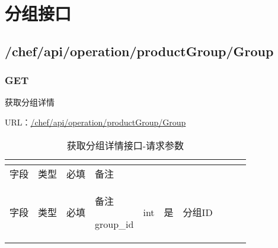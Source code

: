\begin{lstlisting}[language=bash]

\end{lstlisting}






\begin{lstlisting}[language=bash]

\end{lstlisting}



\begin{lstlisting}[language=bash]

\end{lstlisting}






\begin{lstlisting}[language=bash]

\end{lstlisting}



\begin{lstlisting}[language=bash]

\end{lstlisting}







\chapter{分组接口}


\section{/chef/api/operation/productGroup/Group}


\subsection{GET}

获取分组详情

URL：\url{/chef/api/operation/productGroup/Group}





\begin{longtable}{|m{50pt}|m{40pt}|m{50pt}|m{50pt}|}
\tabularnewline\hline
字段&类型&必填&备注
\endhead

\caption{获取分组详情接口-请求参数}\\
\hline
字段&类型&必填&备注
\endfirsthead

\endfoot

\endlastfoot
\hline
group\_id&int&是&分组ID\\
\hline
\end{longtable}

